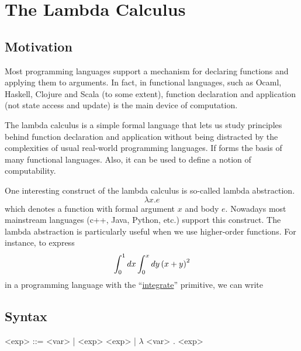 \chapter{The Lambda Calculus}

\section{Motivation}

\begin{enumcirc}
	\item
	Most programming languages support a mechanism for declaring functions and
	applying them to arguments.
	In fact, in functional languages, such as Ocaml, Haskell, Clojure and Scala (to
	some extent),
	function declaration and application (not state access and update) is the main
	device of computation.
	\item
	The lambda calculus is a simple formal language that lets us study principles
	behind function declaration and application without being distracted by the
	complexities of usual real-world programming languages.
	If forms the basis of many functional languages.
	Also, it can be used to define a notion of computability.
	\item
	One interesting construct of the lambda calculus is so-called lambda
	abstraction.
	\[
		\lambda x. e
	\]
	which denotes a function with formal argument $x$ and body $e$.
	Nowadays most mainstream languages (c++, Java, Python, etc.) support this
	construct.
	The lambda abstraction is particularly useful when we use higher-order
	functions.
	For instance, to express
	\[
		\int_{0}^{1} dx \int_{0}^{x} dy \left( x+y \right)^2
	\]
	in a programming language with the ``\ul{integrate}'' primitive, we can write

	\todo

\end{enumcirc}

\section{Syntax}

\begin{center}
	\begin{minipage}{0.5\textwidth}
		\begin{grammar}
			<exp> ::= <var>
			| <exp> <exp> \footnotemark
			| $\lambda$ <var> . <exp> \footnotemark
		\end{grammar}
	\end{minipage}
\end{center}

